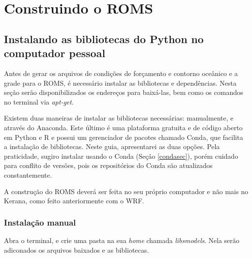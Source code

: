 \chapter{Construindo o ROMS}
\section{Instalando as bibliotecas do Python no computador pessoal}
\bigskip

\noindent Antes de gerar os arquivos de condições de forçamento e contorno oceânico e a grade para o ROMS, é necessário instalar as bibliotecas e dependências. Nesta seção serão disponibilizados os endereços para baixá-las, bem como os comandos no terminal via \textit{apt-get}.
\bigskip

\noindent Existem duas maneiras de instalar as bibliotecas necessárias: manualmente, e através do Anaconda. Este último é uma plataforma gratuita e de código aberto em Python e R e possui um gerenciador de pacotes chamado Conda, que facilita a instalação de bibliotecas. Neste guia, apresentarei as duas opções. Pela praticidade, sugiro instalar usando o Conda (Seção \textcolor{bleu_cite}{\ref{condasec}}), porém cuidado para conflito de versões, pois os repositórios do Conda são atualizados constantemente.
\bigskip

\begin{tcolorbox}[enhanced,
  grow to left by   = 0cm,
  grow to right by  = 0cm,
  enlarge top by    = 0cm,
  enlarge bottom by = 0cm,
  tcbox raise base,
  boxrule           = 1.0pt,
  left              = 18mm,
  colframe          = red!50!black,coltext=red!25!black,colback=red!10!white,
  overlay           = {\begin{tcbclipinterior}\fill[red!75!blue!50!white] (frame.south west)
    rectangle node[text=white,font=\sffamily\bfseries\footnotesize,rotate=0] {ATENÇÃO} ([xshift=18mm]frame.north west);\end{tcbclipinterior}}]
A construção do ROMS deverá ser feita no seu próprio computador e não mais no Kerana, como feito anteriormente com o WRF.
\end{tcolorbox}
\bigskip

\subsection{Instalação manual}
\bigskip
\noindent Abra o terminal, e crie uma pasta na sua \textit{home} chamada \textit{libsmodels}. Nela serão adiconados os arquivos baixados e as bibliotecas.
\bigskip

